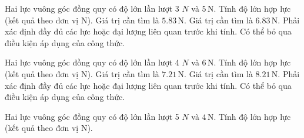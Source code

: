 \begin{ex}
Hai lực vuông góc đồng quy có độ lớn lần lượt 3 $N$ và $5\,\text{N}$. Tính độ lớn hợp lực (kết quả theo đơn vị N).
\choiceTF
{\True Giá trị cần tìm là $5.83\,\text{N}$.}
{Giá trị cần tìm là $6.83\,\text{N}$.}
{\True Phải xác định đầy đủ các lực hoặc đại lượng liên quan trước khi tính.}
{Có thể bỏ qua điều kiện áp dụng của công thức.}
\end{ex}

\begin{ex}
Hai lực vuông góc đồng quy có độ lớn lần lượt 4 $N$ và $6\,\text{N}$. Tính độ lớn hợp lực (kết quả theo đơn vị N).
\choiceTF
{\True Giá trị cần tìm là $7.21\,\text{N}$.}
{Giá trị cần tìm là $8.21\,\text{N}$.}
{\True Phải xác định đầy đủ các lực hoặc đại lượng liên quan trước khi tính.}
{Có thể bỏ qua điều kiện áp dụng của công thức.}
\end{ex}

\begin{ex}
Hai lực vuông góc đồng quy có độ lớn lần lượt 5 $N$ và $4\,\text{N}$. Tính độ lớn hợp lực (kết quả theo đơn vị N).
\end{ex}

